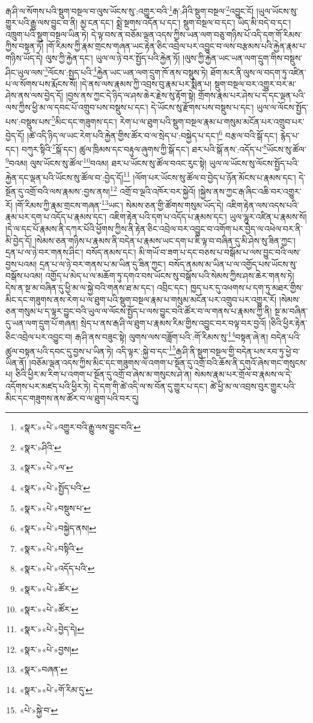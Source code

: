 རྒ་ཤི་ལ་སོགས་པའི་སྡུག་བསྔལ་བ་ལུས་ཡོངས་སུ་:འགྱུར་བའི་\footnote{«སྣར་»«པེ་»འགྱུར་བའི་རྒྱུ་ལས་བྱུང་བའི་}རྒ་:ཤིའི་སྡུག་བསྔལ་\footnote{«སྣར་»ཤིའི་}འབྱུང་ངོ། །ཡུལ་ཡོངས་སུ་གྱུར་པའི་རྒྱུ་ལས་བྱུང་བ་ནི། མྱ་ངན་དང་། སྨྲེ་སྔགས་འདོན་པ་དང་། སྡུག་བསྔལ་བ་དང་། ཡིད་མི་བདེ་བ་དང་། འཁྲུག་པའི་སྡུག་བསྔལ་ཡིན་ཏེ། དེ་ལྟ་བས་ན་བཅོམ་ལྡན་འདས་ཀྱིས་ཡན་ལག་བཅུ་གཉིས་པོ་འདི་དག་གོ་རིམས་ཀྱིས་བསྟན་ཏོ། །གོ་རིམས་ཀྱི་རྣམ་གྲངས་གཞན་ཡང་རྟེན་ཅིང་འབྲེལ་པར་འབྱུང་བ་ལས་བརྩམས་པའི་རྐྱེན་རྣམ་པ་གཉིས་ཡོད་དེ། ལུས་ཀྱི་རྐྱེན་དང་། ཡུལ་ལ་ཉེ་བར་སྤྱོད་པའི་རྐྱེན་ཏོ། །ལུས་ཀྱི་རྐྱེན་ཡང་ཡན་ལག་དྲུག་གིས་བསྡུས་ཤིང་ཡུལ་ལས་\footnote{«སྣར་»«པེ་»ལ་}ལོངས་:སྤྱད་པའི་\footnote{«སྣར་»«པེ་»སྤྱོད་པའི་}རྐྱེན་ཡང་ཡན་ལག་དྲུག་ཁོ་ནས་བསྡུས་ཏེ། ཐོག་མར་ནི་ལུས་ལ་བདག་ཏུ་འཛིན་པ་ལ་སོགས་པས་རྨོངས་སོ། །དེ་ནས་ལས་རྣམས་ཀྱི་འབྲས་བུ་རྣམ་པར་སྨིན་པ། སྡུག་བསྔལ་བར་འགྱུར་བར་མ་ཤེས་ནས་ལས་བྱེད་དོ། །བྱས་ནས་ཀྱང་དེ་ཉིད་ལ་ཤས་ཆེར་རྗེས་སུ་རྟོག་སྟེ། གྲོགས་རྣམ་པར་ཤེས་པ་དེ་དང་ལྡན་པའི་ལས་ཀྱིས་ཕྱི་མ་ལ་དབང་པོ་འགྲུབ་པས་བསྡུས་པ་དང་། དེ་ཡོངས་སུ་རྫོགས་པས་བསྡུས་པ་དང་། ཡུལ་ལ་ལོངས་སྤྱོད་པས་:བསྡུས་པས་\footnote{«སྣར་»«པེ་»བསྡུས་པ་}མིང་དང་གཟུགས་དང་། རེག་པ་ལ་ཐུག་པའི་སྡུག་བསྔལ་རྣམ་པ་གསུམ་མངོན་པར་འགྲུབ་པར་བྱེད་དོ། །ཚེ་འདི་ཉིད་ལ་ཡང་རེག་པའི་རྐྱེན་གྱིས་ཚོར་བ་ལ་སྲེད་པ་:བསྐྱེད་པ་དང་།\footnote{«སྣར་»«པེ་»བསྐྱེད་ནས།} བརྩལ་བའི་སྒོ་དང་། རྙེད་པ་དང་། བཀུར་སྟིའི་\footnote{«སྣར་»«པེ་»བསྟིའི་}སྒོ་དང་། ཚུལ་ཁྲིམས་དང་བརྟུལ་ཞུགས་ཀྱི་སྒོ་དང་། ཐར་པའི་སྒོ་ནས་:འདོད་པ་\footnote{«སྣར་»«པེ་»འདོད་པའི་}ཡོངས་སུ་ཚོལ་\footnote{«སྣར་»«པེ་»ཚོར་}བའམ། ལུས་ཡོངས་སུ་ཚོལ་\footnote{«སྣར་»«པེ་»ཚོར་}བའམ། ཐར་པ་ཡོངས་སུ་ཚོལ་བའང་རུང་སྟེ། ཡུལ་ལ་ཡོངས་སུ་ལོངས་སྤྱོད་པའི་རྐྱེན་དང་ལྡན་པའི་ཡོངས་སུ་ཚོལ་བ་:བྱེད་དོ།\footnote{«སྣར་»«པེ་»བྱེད་དེ།} །ལོག་པར་ཡོངས་སུ་ཚོལ་བ་བྱེད་པ་ཉོན་མོངས་པ་རྣམས་དང་། དེ་སྔོན་དུ་འགྲོ་བའི་ལས་རྣམས་:བྱས་ནས།\footnote{«སྣར་»«པེ་»བྱས།} འགྲོ་བ་ལྔའི་འཁོར་བར་སྐྱེའོ། །སྐྱེས་ནས་ཀྱང་རྒ་ཞིང་འཆི་བར་འགྱུར་རོ། །གོ་རིམས་ཀྱི་རྣམ་གྲངས་གཞན་\footnote{«སྣར་»བཞན་}ཡང་། སེམས་ཅན་གྱི་ཚོགས་གསུམ་ཡོད་དེ། འཇིག་རྟེན་ལས་འདས་པའི་རྣམ་པར་དག་པ་འདོད་པ་རྣམས་དང་། འཇིག་རྟེན་པའི་དག་པ་འདོད་པ་རྣམས་དང་། ཡུལ་ལྷུར་འཛིན་པ་རྣམས་སོ། །དེ་ལ་དང་པོ་རྣམས་ནི་དཀར་པོའི་ཕྱོགས་ཀྱིས་ནི་རྟེན་ཅིང་འབྲེལ་བར་འབྱུང་བ་འགོག་པར་བྱེད་ལ་འཕེལ་བར་ནི་མི་བྱེད་དོ། །སེམས་ཅན་གཉིས་པ་རྣམས་ནི་བདེན་པ་རྣམས་ཡང་དག་པ་ཇི་ལྟ་བ་བཞིན་དུ་མི་ཤེས་སུ་ཟིན་ཀྱང་། དྲན་པ་ལ་ཉེ་བར་གནས་ཤིང་། བསོད་ནམས་དང་། མི་གཡོ་བ་ཟག་པ་དང་བཅས་པ་བསྒོམ་པ་ལས་བྱུང་བའི་ལས་བྱས་པའམ། དྲན་པ་ལ་ཉེ་བར་གནས་པ་མ་ཡིན་དུ་ཟིན་ཀྱང་། བསོད་ནམས་མ་ཡིན་པ་ལ་འགྱོད་པས་ཡོངས་སུ་བསྒོས་པའམ། འགྱོད་པ་མེད་པ་ལ་མཆོག་ཏུ་དགའ་བས་ཡོངས་སུ་བསྒོས་པའི་སེམས་ཀྱིས་ཤས་ཆེར་གནས་ཏེ། དེས་ན་སྔ་མ་བཞིན་དུ་ཕྱི་མ་ལ་སྐྱེ་བའི་གནས་ཐ་མ་དང་། འབྲིང་དང་། ཁྱད་པར་དུ་འཕགས་པ་དག་ཏུ་མཐར་གྱིས་མིང་དང་གཟུགས་ནས་རེག་པ་ལ་ཐུག་པའི་སྡུག་བསྔལ་རྣམ་པ་གསུམ་མངོན་པར་འགྲུབ་པར་འགྱུར་རོ། །སེམས་ཅན་གསུམ་པ་ད་ལྟར་བྱུང་བའི་ཡུལ་ལ་ལོངས་སྤྱོད་པ་ལས་བྱུང་བའི་ཚོར་བ་ལ་གནས་པ་རྣམས་ཀྱི་ནི། སྔ་མ་བཞིན་དུ་ཡན་ལག་དྲུག་པོ་གཞན། སྲེད་པ་ནས་རྒ་ཤི་ལ་ཐུག་པ་རྣམས་རིམ་གྱིས་འབྱུང་བར་བལྟ་བར་བྱའོ། །ཅིའི་ཕྱིར་རྟེན་ཅིང་འབྲེལ་པར་འབྱུང་བ། རྒ་ཤི་ནས་བཟུང་སྟེ། ལུགས་ལས་བཟློག་པའི་:གོ་རིམས་སུ་\footnote{«སྣར་»«པེ་»གོ་རིམ་དུ་}བསྟན་ཞེ་ན། བདེན་པའི་ཚུལ་བསྟན་པའི་དབང་དུ་བྱས་པ་ཡིན་ཏེ། འདི་ལྟར་:སྐྱེ་བ་དང་\footnote{«པེ་»སྐྱེ་བ་}རྒ་ཤི་ནི་སྡུག་བསྔལ་གྱི་བདེན་པས་རབ་ཏུ་ཕྱེ་བ་ཡིན་ནོ། །བཅོམ་ལྡན་འདས་ཀྱིས་མིང་དང་གཟུགས་ལ་འགག་པ་སྔོན་དུ་འགྲོ་བའི་ཆོས་ནི་དགུའོ་ཞེས་གང་གསུངས་པ། ཅིའི་ཕྱིར་མ་རིག་པ་འགག་པ་སྔོན་དུ་འགྲོ་བ་ཞེས་མ་གསུངས་ཤེ་ན། སེམས་རྣམ་པར་གྲོལ་བ་རྣམས་ལ་དེ་འདོགས་པར་མཛད་པའི་ཕྱིར་ཏེ། དེ་དག་གི་ཚེ་འདི་ལ་ས་བོན་དུ་གྱུར་པ་དང་། ཚེ་ཕྱི་མ་ལ་འབྲས་བུར་གྱུར་པའི་མིང་དང་གཟུགས་ནས་ཚོར་བ་ལ་ཐུག་པའི་བར་དུ། 